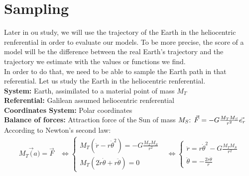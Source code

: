 \section{Sampling}
Later in ou study, we will use the trajectory of the Earth in the heliocentric renferential in order to evaluate our models. To be more precise, the score of a model will be the difference between the real Earth's trajectory and the trajectory we estimate with the values or functions we find.\\
In order to do that, we need to be able to sample the Earth path in that referential. Let us study the Earth in the heliocentric renferential.\\

\noindent
\textbf{System:} Earth, assimilated to a material point of mass \(M_{T}\)\\
\textbf{Referential:} Galilean assumed heliocentric renferential\\
\textbf{Coordinates System:} Polar coordinates\\
\textbf{Balance of forces:} Attraction force of the Sun of mass \(M_{S}$: $\vec{F} = -G\frac{M_{T} M_{S}}{r^{2}}\vec{e_{r}}\)\\

According to Newton's second law:
\[
\begin{align*}
M_{T}\vec(a) = \vec{F}
& \iff
\begin{equation}
    \begin{cases}
    M_{T}(\ddot{r}-r\dot{\theta}^{2}) = -G\frac{M_{T} M_{S}}{r^{2}}\\
    M_{T}(2\dot{r}\dot{\theta}+r\ddot{\theta}) = 0
    \end{cases}
\end{equation}
& \iff
\begin{equation}
    \begin{cases}
    \ddot{r} = r\dot{\theta}^{2}-G\frac{M_{T} M_{S}}{r^{2}}\\
    \ddot{\theta} = -\frac{2\dot{r}\dot{\theta}}{r}
    \end{cases}
\end{equation}
\end{align*}
\]

